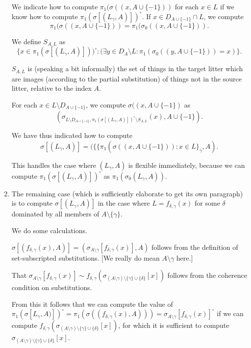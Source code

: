 \documentclass[12pt]{article}
\begin{document}
\begin{enumerate}
We indicate how to compute $\pi_1(\sigma((x,A \cup \{-1\}))$ for each $x \in L$ if we know how to compute $\pi_1(\sigma[(L_\gamma,A)])^\circ$.  If $x \in D_{A\cup \{-1\}} \cap L$, we compute  $$\pi_1(\sigma((x,A \cup \{-1\}))= \pi_1(\sigma_0((x,A \cup \{-1\})).$$  


We define $S_{A,L}$ as $$\{x \in \pi_1(\sigma[(L_\gamma,A)]))^\circ: (\exists y \in D_A \setminus L: \pi_1(\sigma_0((y,A \cup \{-1\})) =x)\}.$$

$S_{A,L}$ is (speaking a bit informally) the set of things in the target litter which are images (according to the partial substitution) of things not in the source litter, relative to the index $A$.


For each $x \in L \setminus D_{A \cup \{-1\}}$, we compute $\sigma((x,A \cup \{-1\})$ as $$(\sigma_{L \setminus D_{A \cup \{-1\}},\pi_1(\sigma[(L_\gamma,A)])^\circ \setminus S_{A,L}}(x),A \cup \{-1\}).$$

We have thus indicated how to compute $$\sigma[(L_\gamma,A)] = (\{\{\pi_1(\sigma((x,A \cup \{-1\})):x \in L\}_\gamma,A).$$

This handles the case where $(L_\gamma,A)$ is flexible immediately, because we can compute $\pi_1(\sigma[(L_\gamma,A)])^\circ$ as $\pi_1(\sigma_0(L_\gamma,A))$.

\item The remaining case (which is sufficiently elaborate to get its own paragraph)  is to compute $\sigma[(L_\gamma,A)]$ in the case where $L = f_{\delta,\gamma}(x)$ for some $\delta$ dominated by all members of $A \setminus \{\gamma\}$.

We do some calculations.  

$\sigma[( f_{\delta,\gamma}(x),A)] = (\sigma_{A \setminus \gamma}[ f_{\delta,\gamma}(x)],A)$ follows from the definition of set-subscripted substitutions.  [We really do mean $A \setminus \gamma$ here.]

That $\sigma_{A \setminus \gamma}[ f_{\delta,\gamma}(x)] \sim f_{\delta,\gamma}(\sigma_{(A \setminus \gamma)\setminus \{\gamma\}\cup \{\delta\}}[x])$ follows from the coherence condition on substitutions.

From this it follows that we can compute the value of $\pi_1(\sigma[L_\gamma,A)])^\circ = \pi_1( \sigma((f_{\delta,\gamma}(x),A))) = \sigma_{A \setminus \gamma}[ f_{\delta,\gamma}(x)]^\circ$ if we can compute $f_{\delta,\gamma}(\sigma_{(A \setminus \gamma)\setminus \{\gamma\}\cup \{\delta\}}[x])$,
for which it is sufficient to compute $\sigma_{(A \setminus \gamma)\setminus \{\gamma\}\cup \{\delta\}}[x]$.


\end{enumerate}
\end{document}
